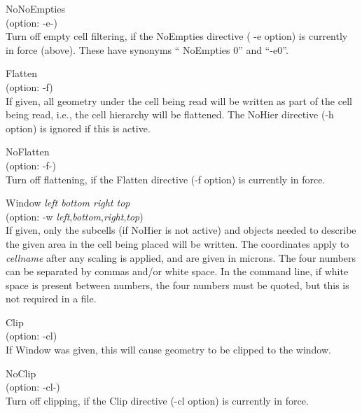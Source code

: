 \begin{description}
\item{\vt NoNoEmpties}\\
(option: {\vt -e-})\\
Turn off empty cell filtering, if the {\vt NoEmpties} directive ({\vt
-e} option) is currently in force (above).  These have synonyms ``{\vt
NoEmpties 0}'' and ``{\vt -e0}''.

\item{\vt Flatten}\\
(option: {\vt -f})\\
If given, all geometry under the cell being read will be written as
part of the cell being read, i.e., the cell hierarchy will be
flattened.  The {\vt NoHier} directive ({\vt -h} option) is ignored if
this is active.

\item{\vt NoFlatten}\\
(option: {\vt -f-})\\
Turn off flattening, if the {\vt Flatten} directive ({\vt -f} option)
is currently in force.

\item{\vt Window} {\it left bottom right top}\\
(option: {\vt -w} {\it left\/},{\it bottom\/},{\it right\/},{\it top})\\
If given, only the subcells (if {\vt NoHier} is not active) and
objects needed to describe the given area in the cell being placed
will be written.  The coordinates apply to {\it cellname} after any
scaling is applied, and are given in microns.  The four numbers can be
separated by commas and/or white space.  In the command line, if white
space is present between numbers, the four numbers must be quoted,
but this is not required in a file.

\item{\vt Clip}\\
(option: {\vt -cl})\\
If {\vt Window} was given, this will cause geometry to be clipped to
the window.

\item{\vt NoClip}\\
(option: {\vt -cl-})\\
Turn off clipping, if the {\vt Clip} directive ({\vt -cl} option) is
currently in force.
\end{description}


